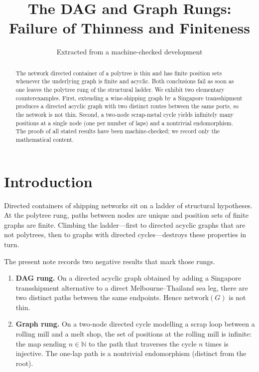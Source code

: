 \documentclass[11pt,a4paper]{article}
\title{The DAG and Graph Rungs:\\
  Failure of Thinness and Finiteness}
\author{Extracted from a machine-checked development}
\date{}
\theoremstyle{plain}
\theoremstyle{definition}
\newcommand{\N}{\mathbb{N}}
\begin{document}
\maketitle

\begin{abstract}
The network directed container of a polytree is thin and has finite position
sets whenever the underlying graph is finite and acyclic. Both conclusions
fail as soon as one leaves the polytree rung of the structural ladder. We
exhibit two elementary counterexamples. First, extending a wine-shipping
graph by a Singapore transshipment produces a directed acyclic graph with two
distinct routes between the same ports, so the network is not thin. Second, a
two-node scrap-metal cycle yields infinitely many positions at a single node
(one per number of laps) and a nontrivial endomorphism. The proofs of all
stated results have been machine-checked; we record only the mathematical
content.
\end{abstract}

\tableofcontents
\bigskip

\section{Introduction}

Directed containers of shipping networks sit on a ladder of structural
hypotheses. At the polytree rung, paths between nodes are unique and position
sets of finite graphs are finite. Climbing the ladder---first to directed
acyclic graphs that are not polytrees, then to graphs with directed
cycles---destroys these properties in turn.

The present note records two negative results that mark those rungs.
\begin{enumerate}
  \item \textbf{DAG rung.} On a directed acyclic graph obtained by adding a
        Singapore transshipment alternative to a direct Melbourne--Thailand sea
        leg, there are two distinct paths between the same endpoints. Hence
        $\mathrm{network}(G)$ is not thin.
  \item \textbf{Graph rung.} On a two-node directed cycle modelling a scrap
        loop between a rolling mill and a melt shop, the set of positions at
        the rolling mill is infinite: the map sending $n \in \N$ to the path
        that traverses the cycle $n$ times is injective. The one-lap path is a
        nontrivial endomorphism (distinct from the root).
\end{enumerate}
\end{document}
